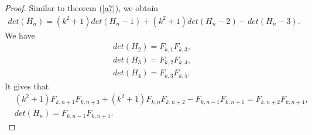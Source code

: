 \begin{proof}
Similar to theorem (\ref{a7}), we obtain
\begin{align*}
det(H_n) = (k^2+1)det(H_n-1) + (k^2+1)det(H_n-2)- det(H_n-3). 
\end{align*}
We have
\begin{align*}
det(H_2) = F_{k, 1} F_{k, 3},\\
det(H_3) = F_{k, 2} F_{k, 4},\\
det(H_4) = F_{k, 3} F_{k, 5}.
\end{align*}
It gives that
\begin{align*}
&(k^2+1)F_{k,n+1} F_{k, n+3}+(k^2+1)F_{k,n} F_{k, n+2}-F_{k,n-1} F_{k, n+1} =  F_{k,n+2} F_{k, n+4},\\
&det (H_n) =  F_{k, n-1} F_{k, n+1}.
\end{align*}
\end{proof}
